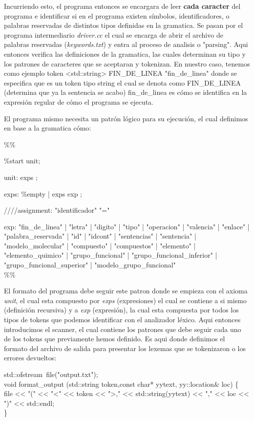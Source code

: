 Incurriendo esto, el programa entonces se encargara de leer \textbf{cada caracter} del programa e identificar si en el programa existen símbolos, identificadores, o
palabras reservadas de distintos tipos definidas en la gramatica. Se pasan por el programa intermediario \textit{driver.cc} el cual se encarga de abrir el archivo de
palabras reservadas (\textit{keywords.txt}) y entra al proceso de analisis o "parsing". Aqui entonces verifica las definiciones de la gramatica, las cuales 
determinan su tipo y los patrones de caracteres que se aceptaran y tokenizan. En nuestro caso, tenemos como ejemplo token <std::string> FIN\_DE\_LINEA "fin\_de\_linea" 
donde se especifica que es un token tipo string el cual se denota como FIN\_DE\_LINEA (determina que ya la sentencia se acabo) fin\_de\_linea es cómo se identifica 
en la expresión regular de cómo el programa se ejecuta.

El programa mismo necesita un patrón lógico para su ejecución, el cual definimos en base a la gramatica cómo:


\%\%


\%start unit;


unit: exps {};


exps: \%empty | exps exp {};


////assignment: "identificador" "="


exp:
"fin\_de\_linea" {}
| "letra" {}
| "digito" {}
| "tipo" {}
| "operacion" {}
| "valencia" {}
| "enlace" {}
| "palabra\_reservada" {}
| "id" {}
| "idcont" {}
| "sentencias" {}
| "sentencia" {}
| "modelo\_molecular" {}
| "compuesto" {}
| "compuestos" {}
| "elemento" {}
| "elemento\_quimico" {}
| "grupo\_funcional" {}
| "grupo\_funcional\_inferior" {}
| "grupo\_funcional\_superior" {}
| "modelo\_grupo\_funcional" {}\\
\%\%

\newpage
El formato del programa debe seguir este patron donde se empieza con el axioma \textit{unit}, el cual esta compuesto por \textit{exps{}} (expresiones) el cual 
se contiene a si mismo (definición recursiva) y a \textit{exp} (expresión), la cual esta compuesta por todos los tipos de tokens que podemos identificar 
con el analizador léxico. Aqui entonces introducimos el scanner, el cual contiene los patrones que debe seguir cada uno de los tokens que previamente hemos definido.
Es aqui donde definimos el formato del archivo de salida para presentar los lexemas que se tokenizaron o los errores devueltos:


std::ofstream\ file("output.txt");\\
\indent void format\_output (std::string token,const char* yytext, yy::location\& loc) \{\\
\indent file << "(" << "<" << token << ">," << std::string(yytext) << "," << loc << ")" << std::endl;\\
\indent\}

